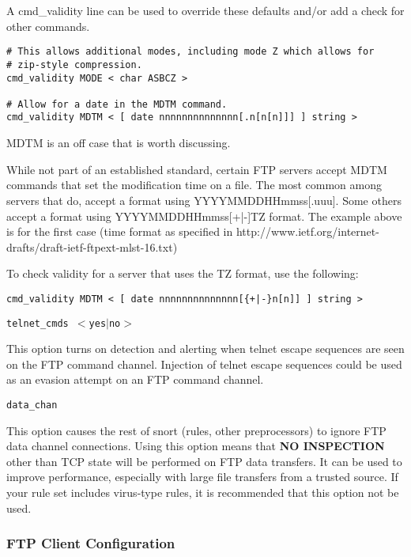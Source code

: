 \documentclass[english]{report}
\newcounter{slistnum}
\newenvironment{slist}
{ \begin{list}{ {\bf \arabic{slistnum}.} }{\usecounter{slistnum} } }
{ \end{list} }
\begin{document}
\begin{slist}
A cmd\_validity line can be used to override these defaults and/or add
a check for other commands.

\begin{verbatim}
# This allows additional modes, including mode Z which allows for
# zip-style compression.
cmd_validity MODE < char ASBCZ >

# Allow for a date in the MDTM command.
cmd_validity MDTM < [ date nnnnnnnnnnnnnn[.n[n[n]]] ] string >
\end{verbatim}

MDTM is an off case that is worth discussing.

While not part of an established standard, certain FTP servers accept
MDTM commands that set the modification time on a file.  The most common
among servers that do, accept a format using YYYYMMDDHHmmss[.uuu].  Some
others accept a format using YYYYMMDDHHmmss[+|-]TZ format.  The example
above is for the first case (time format as specified in
http://www.ietf.org/internet-drafts/draft-ietf-ftpext-mlst-16.txt)

To check validity for a server that uses the TZ format, use the following:

\begin{verbatim}
cmd_validity MDTM < [ date nnnnnnnnnnnnnn[{+|-}n[n]] ] string >
\end{verbatim}

\item \texttt{telnet\_cmds $<$yes$|$no$>$}

This option turns on detection and alerting when telnet escape sequences are
seen on the FTP command channel.  Injection of telnet escape sequences
could be used as an evasion attempt on an FTP command channel.

\item \texttt{data\_chan}

This option causes the rest of snort (rules, other preprocessors) to
ignore FTP data channel connections.  Using this option means that
\textbf{NO INSPECTION} other than TCP state will be performed on FTP
data transfers.  It can be used to improve performance, especially with
large file transfers from a trusted source.   If your rule set includes
virus-type rules, it is recommended that this option not be used.

\end{slist}

\subsubsection{FTP Client Configuration}
\end{document}
